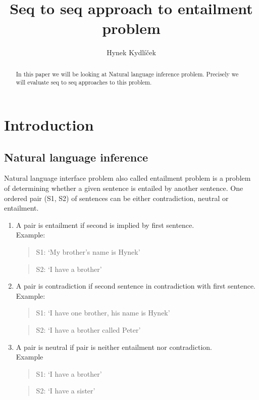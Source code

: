 \documentclass{article}
\author{Hynek Kydlíček}
\title{Seq to seq approach to entailment problem}
\begin{document}
    \maketitle
    \begin{abstract}
        In this paper we will be looking at Natural language inference problem.
        Precisely we will evaluate seq to seq approaches to this problem.
    \end{abstract}

    \section{Introduction}


    \subsection{Natural language inference}
    Natural language interface problem also called entailment problem is a problem of determining whether a given sentence is entailed by another sentence.
    One ordered pair (S1, S2) of sentences can be either contradiction, neutral or entailment.
    \begin{enumerate}
        \item A pair is entailment if second is implied by first sentence.\\
            Example:
            \begin{quotation}
                S1: `My brother's name is Hynek'
            \end{quotation}
            \begin{quotation}
                S2: `I have a brother'
            \end{quotation}

        \item A pair is contradiction if second sentence in contradiction with first sentence.\\
            Example:
            \begin{quotation}
                S1: `I have one brother, his name is Hynek'  
            \end{quotation}
            \begin{quotation}
                S2: `I have a brother called Peter'
            \end{quotation}

        \item A pair is neutral if pair is neither entailment nor contradiction.\\
            Example
            \begin{quotation}
                S1: `I have a brother'
            \end{quotation}
            \begin{quotation}
                S2: `I have a sister'
            \end{quotation}
    \end{enumerate}
\end{document}
